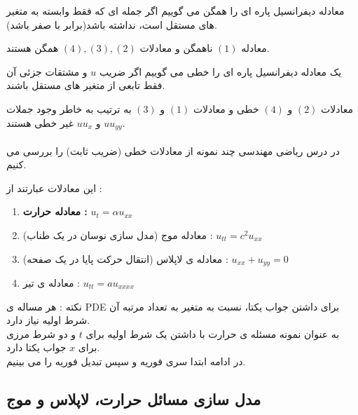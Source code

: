 \begin{definition}
معادله دیفرانسیل پاره ای را همگن می گوییم اگر جمله ای که فقط وابسته به متغیر های مستقل است، نداشته باشد(برابر با صفر باشد).\\
\end{definition}
معادله
$(1)$
  ناهمگن و معادلات
$(4),(3),(2)$
 همگن هستند.\\
 
\begin{definition}
 یک معادله دیفرانسیل پاره ای را خطی می گوییم اگر ضریب
 $u$
 و مشتقات جزئی آن فقط تابعی از متغیر های مستقل باشند.
\end{definition}
  معادلات
 $(2)$
 و
 $(4)$
 خطی و معادلات 
 $(1)$
 و
 $(3)$
 به ترتیب به خاطر وجود جملات
 $uu_{yy}$
 و
 $uu_x$
 غیر خطی هستند.\\
\\
 در درس ریاضی مهندسی چند نمونه از معادلات خطی (ضریب ثابت) را بررسی می کنیم.
 
 این معادلات عبارتند از :
 \begin{enumerate}
 	\item 
 	\textbf{
 	معادله حرارت : 
 }
 	$u_t=\alpha u_{xx}$
 	\item
 	معادله موج (مدل سازی نوسان در یک طناب) : 
 	$u_{tt}=c^2u_{xx}$
 	\item
 	معادله ی لاپلاس (انتقال حرکت پایا در یک صفحه) : 
 	$u_{xx}+u_{yy}=0$
 	\item
 	معادله ی تیر :
 	$u_{tt}=au_{xxxx}$
 \end{enumerate}

نکته : هر مساله ی 
PDE
برای داشتن جواب یکتا، نسبت به متغیر به تعداد مرتبه آن شرط اولیه نیاز دارد.\\
به عنوان نمونه مسئله ی حرارت با داشتن یک شرط اولیه برای 
$t$
و دو شرط مرزی برای 
$x$
جواب یکتا دارد.\\
در ادامه ابتدا سری فوریه و سپس تبدیل فوریه را می بینیم.
\subsection*{مدل سازی مسائل حرارت، لاپلاس و موج}
